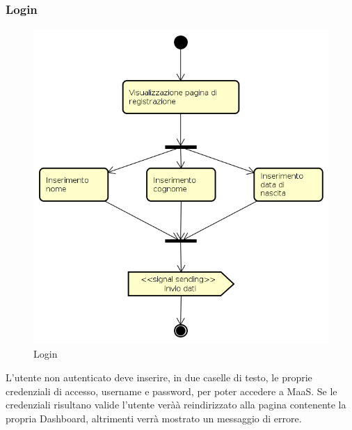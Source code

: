 \subsubsection{Login}
\begin{figure}[H]
\begin{center}
\includegraphics[height=12cm]{res/sections/backend/activities/registrazione.png}
\caption{Login}
\end{center}
\end{figure}
L'utente non autenticato deve inserire, in due caselle di testo, le proprie credenziali di accesso, username e password, per poter accedere a MaaS. Se le credenziali risultano valide l'utente veràà reindirizzato alla pagina contenente la propria Dashboard, altrimenti verrà mostrato un messaggio di errore.
